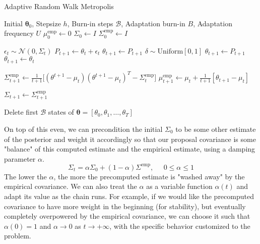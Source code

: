 \documentclass{article}
\theoremstyle{remark}
\theoremstyle{definition}
\begin{document}
\begin{algorithm}
\caption{Adaptive Random Walk Metropolis}\label{alg:cap}
\begin{algorithmic}

\Require Initial $\boldsymbol{\theta}_0$, Stepsize $h$, Burn-in steps $\mathcal{B}$, Adaptation burn-in $B$, Adaptation frequency $U$
\State $\mu_0^\mathrm{emp} \gets 0$ 
\State $\Sigma_0 \gets I$
\State $\Sigma^\mathrm{emp}_0 \gets I$

    \State $\epsilon_t \sim \mathcal{N}(0, \Sigma_t)$ 
    \State $P_{t+1} \gets \theta_t + \epsilon_t$
        \State $\theta_{t+1} \gets P_{t+1}$ 
    \Else
        \State $\delta \sim \mathrm{Uniform}[0, 1]$
            \State $\theta_{t+1} \gets P_{t+1}$ 
        \Else 
            \State $\theta_{t+1} \gets \theta_t$
        \EndIf
    \EndIf
    
    \State $\Sigma^\mathrm{emp}_{t+1} \gets \frac{1}{t+1} \big[(\theta^{t+1} - \mu_t) (\theta^{t+1} - \mu_t)^T - \Sigma^\mathrm{emp}_t \big]$
    \State $\mu_{t+1}^{\mathrm{emp}} \gets \mu_t + \frac{1}{t+1} [ \theta_{t+1} - \mu_t ]$
    
        \State $\Sigma_{t+1} \gets \Sigma^\mathrm{emp}_{t+1}$
    \EndIf
\EndFor

\State Delete first $\mathcal{B}$ states of $\boldsymbol{\theta} = [\theta_0, \theta_1, \ldots, \theta_T]$

\end{algorithmic}
\end{algorithm}

\pagebreak

On top of this even, we can precondition the initial $\Sigma_0$ to be some other estimate of the posterior and weight it accordingly so that our proposal covariance is some "balance" of this computed estimate and the empirical estimate, using a damping parameter $\alpha$. 
\[\Sigma_t = \alpha \Sigma_0 + (1 - \alpha) \Sigma^{\mathrm{emp}}, \;\;\;\;\; 0 \leq \alpha \leq 1\]
The lower the $\alpha$, the more the precomputed estimate is "washed away" by the empirical covariance. We can also treat the $\alpha$ as a variable function $\alpha(t)$ and adapt its value as the chain runs. For example, if we would like the precomputed covariance to have more weight in the beginning (for stability), but eventually completely overpowered by the empirical covariance, we can choose it such that $\alpha(0) = 1$ and $\alpha \rightarrow 0$ as $t \rightarrow +\infty$, with the specific behavior customized to the problem. 
\end{document}
